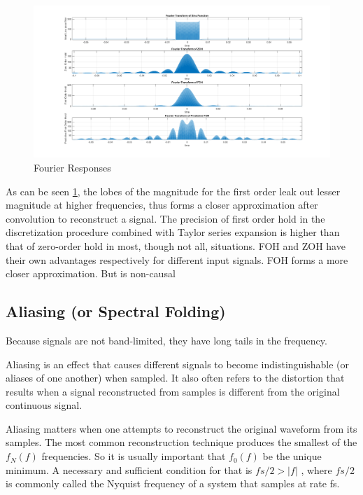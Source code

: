 \documentclass{article}
\begin{document}
\begin{figure}[htbp]
    \begin{center}
	\includegraphics[width=175mm]{figures/Fourier_responses.png}
    \end{center}
    \caption{Fourier Responses}
    \label{fig:frfz}
\end{figure}

As can be seen \ref{fig:frfz}, the lobes of the magnitude for the first order leak out lesser magnitude at higher frequencies, thus forms a closer approximation after convolution to reconstruct a signal. The precision of first order hold in the discretization procedure combined with Taylor series expansion is higher than that of zero-order hold in most, though not all, situations. FOH and ZOH have their own advantages respectively for different input signals. FOH forms a more closer approximation. But is non-causal 

\subsection{Aliasing (or Spectral Folding)}
Because signals are not band-limited,  they have long tails in the frequency. 

Aliasing \cite{b8} is an effect that causes different signals to become indistinguishable (or aliases of one another) when sampled. It also often refers to the distortion that results when a signal reconstructed from samples is different from the original continuous signal. 

Aliasing matters when one attempts to reconstruct the original waveform from its samples. The most common reconstruction technique produces the smallest of the $ f_N(f) $  frequencies. So it is usually important that $ f_0(f) $ be the unique minimum.  A necessary and sufficient condition for that is $ fs/2 > | f | $ ,  where $ fs/2 $ is commonly called the Nyquist frequency of a system that samples at rate  fs. 
\end{document}

